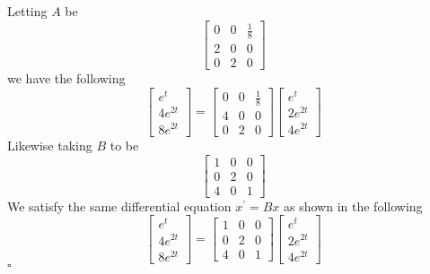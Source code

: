 \documentclass[11pt]{article}
\newenvironment{proof}{\noindent{\bf Proof.}}{\hfill $\square$\medskip}
\begin{document}
\begin{proof}
Letting $A$ be 
$$\begin{bmatrix}
    0&0&\frac{1}{8}\\
    2&0&0\\
    0&2&0
\end{bmatrix}$$
we have the following
$$\begin{bmatrix}
    e^{t}\\
    4e^{2t}\\
    8e^{2t}
\end{bmatrix}=\begin{bmatrix}
    0&0&\frac{1}{8}\\
    4&0&0\\
    0&2&0
\end{bmatrix}
\begin{bmatrix}
    e^{t}\\
    2e^{2t}\\
    4e^{2t}
\end{bmatrix}$$
Likewise taking $B$ to be
$$\begin{bmatrix}
    1&0&0\\
    0&2&0\\
    4&0&1
\end{bmatrix}
$$
We satisfy the same differential equation $x^{\prime}=Bx$ as shown in the following
$$\begin{bmatrix}
    e^{t}\\
    4e^{2t}\\
    8e^{2t}
\end{bmatrix}=
\begin{bmatrix}
    1&0&0\\
    0&2&0\\
    4&0&1
\end{bmatrix}
\begin{bmatrix}
    e^{t}\\
    2e^{2t}\\
    4e^{2t}
\end{bmatrix}$$
\end{proof}
\end{document}
